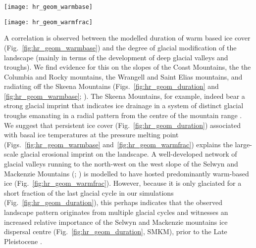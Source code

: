 \documentclass[tc, manuscript]{copernicus}
\begin{document}
\begin{figure*}
  \texttt{[image: hr\_geom\_warmbase]}
  \caption{Modelled duration of warm-based ice cover during the last
           120\,ka. Long ice cover durations combined with basal
           temperatures at the pressure melting point may explain the strong
           glacial erosional imprint of the Skeena Mountains (SM) landscape.
           Hatches indicate areas that were covered by cold ice only.}
  \label{fig:hr_geom_warmbase}
\end{figure*}

\begin{figure*}
  \vspace{-0.5mm}  %
  \texttt{[image: hr\_geom\_warmfrac]}
  \caption{Modelled fraction of warm-based ice cover during the ice-covered
           period. Note the dominance of warm-based conditions on the
           continental shelf and major glacial troughs of the coastal ranges.
           Hatches indicate areas that were covered by cold ice only.}
  \label{fig:hr_geom_warmfrac}
\end{figure*}

A correlation is observed between the modelled duration of warm based ice cover
(Fig.~\ref{fig:hr_geom_warmbase}) and the degree of glacial modification of the
landscape (mainly in terms of the development of deep glacial valleys and
troughs). We find evidence for this on the slopes of the Coast Mountains, the
the Columbia and Rocky mountains, the Wrangell and Saint Elias mountains, and
radiating off the Skeena Mountains
(Figs.~\ref{fig:hr_geom_duration} and \ref{fig:hr_geom_warmbase};
\citealp[Fig.~2]{Kleman.etal.2010}).
The Skeena Mountains, for example, indeed bear a strong glacial imprint that
indicates ice drainage in a system of distinct glacial troughs emanating in a
radial pattern from the centre of the mountain range
\citep[Fig.~2]{Kleman.etal.2010}. We suggest that
persistent ice cover (Fig.~\ref{fig:hr_geom_duration}) associated with basal ice
temperatures at the pressure melting point (Figs.~\ref{fig:hr_geom_warmbase}
and~\ref{fig:hr_geom_warmfrac}) explains the large-scale glacial erosional imprint on
the landscape. A well-developed network of glacial valleys running to the
north-west on the west slope of the Selwyn
and Mackenzie Mountains (\citealp[Fig.~2]{Kleman.etal.2010}; \citealp[Fig.~8]
{Stroeven.etal.2010}) is modelled to have hosted predominantly warm-based ice
(Fig.~\ref{fig:hr_geom_warmfrac}). However, because it is only glaciated for a
short fraction of the last glacial cycle in our simulations
(Fig.~\ref{fig:hr_geom_duration}), this perhaps indicates that
the observed landscape pattern originates from multiple glacial cycles and
witnesses an increased relative importance of the Selwyn and Mackenzie
mountains ice dispersal centre (Fig.~\ref{fig:hr_geom_duration}, SMKM), prior
to the Late Pleistocene \citep[cf.][]{Ward.etal.2008, Demuro.etal.2012}.
\end{document}
